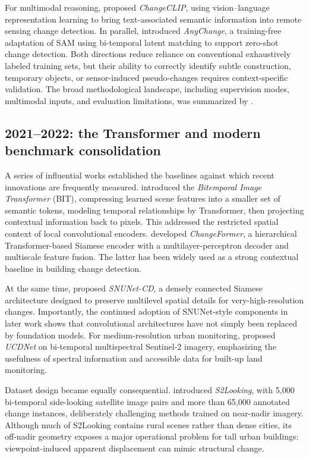 \documentclass[11pt,a4paper]{article}
\begin{document}
For multimodal reasoning, \citet{Dong2024} proposed \emph{ChangeCLIP}, using vision--language representation learning to bring text-associated semantic information into remote sensing change detection. In parallel, \citet{Zheng2024} introduced \emph{AnyChange}, a training-free adaptation of SAM using bi-temporal latent matching to support zero-shot change detection. Both directions reduce reliance on conventional exhaustively labeled training sets, but their ability to correctly identify subtle construction, temporary objects, or sensor-induced pseudo-changes requires context-specific validation. The broad methodological landscape, including supervision modes, multimodal inputs, and evaluation limitations, was summarized by \citet{ChengReview2024}.

\subsection{2021--2022: the Transformer and modern benchmark consolidation}

A series of influential works established the baselines against which recent innovations are frequently measured. \citet{ChenBIT2022} introduced the \emph{Bitemporal Image Transformer} (BIT), compressing learned scene features into a smaller set of semantic tokens, modeling temporal relationships by Transformer, then projecting contextual information back to pixels. This addressed the restricted spatial context of local convolutional encoders. \citet{Bandara2022} developed \emph{ChangeFormer}, a hierarchical Transformer-based Siamese encoder with a multilayer-perceptron decoder and multiscale feature fusion. The latter has been widely used as a strong contextual baseline in building change detection.

At the same time, \citet{Fang2022} proposed \emph{SNUNet-CD}, a densely connected Siamese architecture designed to preserve multilevel spatial details for very-high-resolution changes. Importantly, the continued adoption of SNUNet-style components in later work \citep{Tiwari2026} shows that convolutional architectures have not simply been replaced by foundation models. For medium-resolution urban monitoring, \citet{Basavaraju2022} proposed \emph{UCDNet} on bi-temporal multispectral Sentinel-2 imagery, emphasizing the usefulness of spectral information and accessible data for built-up land monitoring.

Dataset design became equally consequential. \citet{Shen2021} introduced \emph{S2Looking}, with 5,000 bi-temporal side-looking satellite image pairs and more than 65,000 annotated change instances, deliberately challenging methods trained on near-nadir imagery. Although much of S2Looking contains rural scenes rather than dense cities, its off-nadir geometry exposes a major operational problem for tall urban buildings: viewpoint-induced apparent displacement can mimic structural change.
\end{document}

